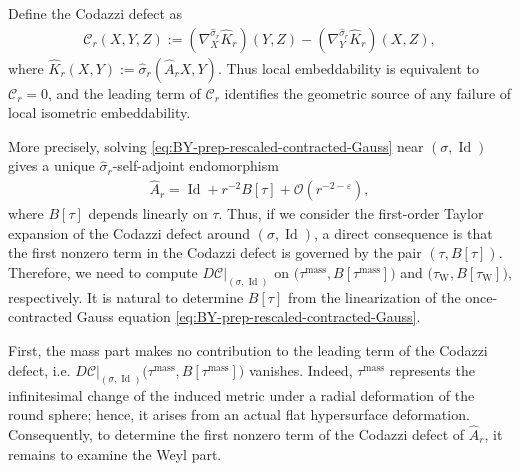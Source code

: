 \documentclass[10pt]{amsart}
\newcommand{\Weyl}{\operatorname{W}}
\newcommand{\Id}{\operatorname{Id}}
\newcommand{\mass}{\mathrm{mass}}
\theoremstyle{plain}
\theoremstyle{remark}
\begin{document}
	Define the Codazzi defect as
	\begin{align}
		\mathcal C_r(X,Y,Z)
		:=
		(\nabla_X^{\hat\sigma_r}\hat K_r)(Y,Z)
		-
		(\nabla_Y^{\hat\sigma_r}\hat K_r)(X,Z),
	\end{align}
	where
	$\hat K_r(X,Y):=\hat\sigma_r(\hat A_rX,Y)$. Thus local embeddability is equivalent to $\mathcal C_r=0$, and the leading term of $\mathcal C_r$ identifies the geometric source of any failure of local
	isometric embeddability.
	
	More precisely, solving \eqref{eq:BY-prep-rescaled-contracted-Gauss} near
	$(\sigma,\Id)$ gives a unique $\hat\sigma_r$-self-adjoint endomorphism
	\begin{align*}
		\hat A_r
		=
		\Id+r^{-2}B[\tau]+\mathcal O(r^{-2-\varepsilon}),
	\end{align*}
	where $B[\tau]$ depends linearly on $\tau$. Thus, if we consider the first-order Taylor expansion of the Codazzi
	defect around $(\sigma,\Id)$, a direct consequence is that the first nonzero term in the Codazzi defect
	is governed by the pair $(\tau,B[\tau])$. Therefore, we need to compute $D\mathcal C\big|_{(\sigma,\Id)}$ on $\bigl(\tau^{\mathrm{mass}}, B[\tau^{\mathrm{mass}}]\bigr)$ and $\bigl(\tau_{\Weyl}, B[\tau_{\Weyl}]\bigr)$, respectively. It is natural to determine $B[\tau]$ from the linearization of the once-contracted Gauss equation \eqref{eq:BY-prep-rescaled-contracted-Gauss}. 
	
	First, the mass part makes no contribution to the leading term of the Codazzi defect, i.e. $D\mathcal C\big|_{(\sigma,\Id)}\bigl(\tau^{\mathrm{mass}}, B[\tau^{\mathrm{mass}}]\bigr)$ vanishes. Indeed, $\tau^{\mass}$ represents the infinitesimal change of the induced metric under a radial deformation of the round sphere; hence, it arises from an actual flat hypersurface deformation. Consequently, to determine the first nonzero term of the Codazzi defect of $\hat A_r$, it remains to examine the Weyl part.
	
\end{document}
